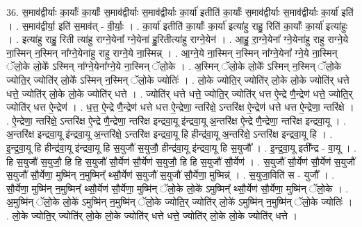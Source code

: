 \documentclass[17pt]{extarticle}
\begin{document}
36. स॒माव॑द्वीर्याः का॒र्याः᳚ का॒र्याः᳚ स॒माव॑द्वीर्याः स॒माव॑द्वीर्याः का॒र्या॑ इतीति॑ का॒र्याः᳚ स॒माव॑द्वीर्याः स॒माव॑द्वीर्याः का॒र्या॑ इति॑ । . स॒माव॑द्वीर्या॒ इति॑ स॒माव॑त् - वी॒र्याः॒ । . का॒र्या॑ इतीति॑ का॒र्याः᳚ का॒र्या॑ इत्या॑हु राहु॒ रिति॑ का॒र्याः᳚ का॒र्या॑ इत्या॑हुः । . इत्या॑हु राहु॒ रिती त्या॑हु राग्ने॒येना᳚ ग्ने॒येना॑ हु॒रितीत्या॑हु राग्ने॒येन॑ । . आ॒हु॒ रा॒ग्ने॒येना᳚ ग्ने॒येना॑हु राहु राग्ने॒ये ना॒स्मिन् न॒स्मिन् ना᳚ग्ने॒येना॑हु राहु राग्ने॒ये ना॒स्मिन्न् । . आ॒ग्ने॒ये ना॒स्मिन् न॒स्मिन् ना᳚ग्ने॒येना᳚ ग्ने॒ये ना॒स्मिन् ॅलो॒के लो॒के᳚ ऽस्मिन् ना᳚ग्ने॒येना᳚ग्ने॒ये ना॒स्मिन् ॅलो॒के । . अ॒स्मिन् ॅलो॒के लो॒के᳚ ऽस्मिन् न॒स्मिन् ॅलो॒के ज्योति॒र् ज्योति॑र् लो॒के᳚ ऽस्मिन् न॒स्मिन् ॅलो॒के ज्योतिः॑ । . लो॒के ज्योति॒र् ज्योति॑र् लो॒के लो॒के ज्योति॑र् धत्ते धत्ते॒ ज्योति॑र् लो॒के लो॒के ज्योति॑र् धत्ते । . ज्योति॑र् धत्ते धत्ते॒ ज्योति॒र् ज्योति॑र् धत्त ऐ॒न्द्रे णै॒न्द्रेण॑ धत्ते॒ ज्योति॒र् ज्योति॑र् धत्त ऐ॒न्द्रेण॑ । . ध॒त्त॒ ऐ॒न्द्रे णै॒न्द्रेण॑ धत्ते धत्त ऐ॒न्द्रेणा॒ न्तरि॑क्षे॒ ऽन्तरि॑क्ष ऐ॒न्द्रेण॑ धत्ते धत्त ऐ॒न्द्रेणा॒ न्तरि॑क्षे । . ऐ॒न्द्रेणा॒ न्तरि॑क्षे॒ ऽन्तरि॑क्ष ऐ॒न्द्रे णै॒न्द्रेणा॒ न्तरि॑क्ष इन्द्रवा॒यू इ॑न्द्रवा॒यू अ॒न्तरि॑क्ष ऐ॒न्द्रे
णै॒न्द्रेणा॒ न्तरि॑क्ष इन्द्रवा॒यू । . अ॒न्तरि॑क्ष इन्द्रवा॒यू इ॑न्द्रवा॒यू अ॒न्तरि॑क्षे॒ ऽन्तरि॑क्ष इन्द्रवा॒यू हि हीन्द्र॑वा॒यू अ॒न्तरि॑क्षे॒ ऽन्तरि॑क्ष इन्द्रवा॒यू हि । . इ॒न्द्र॒वा॒यू हि हीन्द्र॑वा॒यू इ॑न्द्रवा॒यू हि स॒युजौ॑ स॒युजौ॒ हीन्द्र॑वा॒यू इ॑न्द्रवा॒यू हि स॒युजौ᳚ । . इ॒न्द्र॒वा॒यू इती᳚न्द्र - वा॒यू । . हि स॒युजौ॑ स॒युजौ॒ हि हि स॒युजौ॑ सौ॒र्येण॑ सौ॒र्येण॑ स॒युजौ॒ हि हि स॒युजौ॑ सौ॒र्येण॑ । . स॒युजौ॑ सौ॒र्येण॑ सौ॒र्येण॑ स॒युजौ॑ स॒युजौ॑ सौ॒र्येणा॒ मुष्मि॑न् न॒मुष्मिन्᳚ थ्सौ॒र्येण॑ स॒युजौ॑ स॒युजौ॑ सौ॒र्येणा॒ मुष्मिन्न्॑ । . स॒युजा॒विति॑ स - युजौ᳚ । . सौ॒र्येणा॒ मुष्मि॑न् न॒मुष्मिन्᳚ थ्सौ॒र्येण॑ सौ॒र्येणा॒ मुष्मि॑न् ॅलो॒के लो॒के॑ ऽमुष्मिन्᳚ थ्सौ॒र्येण॑ सौ॒र्येणा॒ मुष्मि॑न् ॅलो॒के । . अ॒मुष्मि॑न् ॅलो॒के लो॒के॑ ऽमुष्मि॑न् न॒मुष्मि॑न् ॅलो॒के ज्योति॒र् ज्योति॑र् लो॒के॑ ऽमुष्मि॑न् न॒मुष्मि॑न् ॅलो॒के ज्योतिः॑ । . लो॒के ज्योति॒र् ज्योति॑र् लो॒के लो॒के ज्योति॑र् धत्ते धत्ते॒ ज्योति॑र् लो॒के लो॒के ज्योति॑र् धत्ते । \newline
\pagebreak
{}
\end{document}
